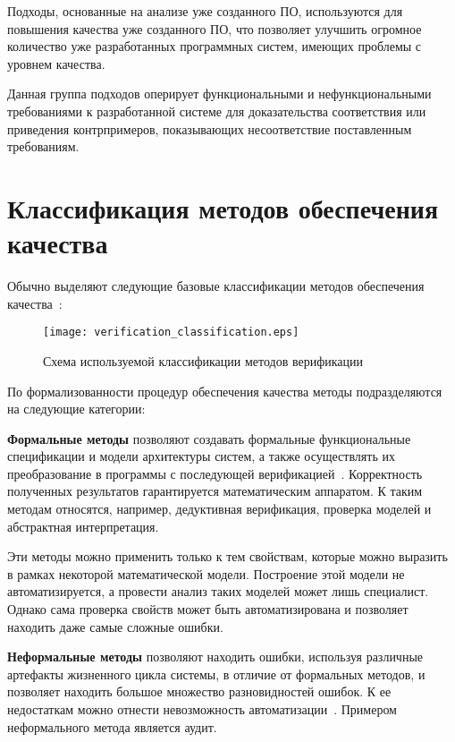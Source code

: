 Подходы, основанные на анализе уже созданного ПО, используются для повышения
качества уже созданного ПО, что позволяет улучшить огромное количество уже
разработанных программных систем, имеющих проблемы с уровнем качества.

Данная группа подходов оперирует функциональными и нефункциональными
требованиями к разработанной системе для доказательства соответствия или
приведения контрпримеров, показывающих несоответствие поставленным требованиям.

\section{Классификация методов обеспечения качества}

Обычно выделяют следующие базовые классификации методов обеспечения
качества~\cite{itsykson}:

\begin{figure}[ht]
    \begin{center}
        \texttt{[image: verification\_classification.eps]}
    \end{center}
    \caption{Схема используемой классификации методов верификации}
    \label{fig:verification_classification}
\end{figure}

По формализованности процедур обеспечения качества методы подразделяются на
следующие категории:

\textbf{Формальные методы} позволяют создавать формальные функциональные
спецификации и модели архитектуры систем, а также осуществлять их преобразование
в программы с последующей верификацией~\cite{formal_methods}. Корректность
полученных результатов гарантируется математическим аппаратом. К таким методам
относятся, например, дедуктивная верификация, проверка моделей и абстрактная
интерпретация.

Эти методы можно применить только к тем свойствам, которые можно выразить в
рамках некоторой математической модели. Построение этой модели не
автоматизируется, а провести анализ таких моделей может лишь специалист. Однако
сама проверка свойств может быть автоматизирована и позволяет находить даже
самые сложные ошибки.

\textbf{Неформальные методы} позволяют находить ошибки, используя различные
артефакты жизненного цикла системы, в отличие от формальных методов, и позволяет
находить большое множество разновидностей ошибок. К ее недостаткам можно отнести
невозможность автоматизации~\cite{kulyamin}. Примером неформального метода
является аудит.


